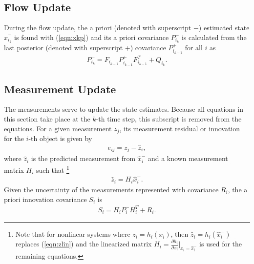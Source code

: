 \documentclass[letterpaper, paper,10pt]{AAS}		%
\newcommand{\refeqn}[1]{(\ref{eqn:#1})}
\newcommand{\deriv}[2]{\ensuremath{\frac{\partial #1}{\partial #2}}}
\begin{document}
\subsection{Flow Update}

During the flow update, the a priori (denoted with superscript $-$) estimated state $\hat x_{i_k}^-$ is found with \refeqn{xkp} and its a priori covariance $P_{i_k}^-$ is calculated from the last posterior (denoted with superscript $+$) covariance $P_{i_{k-1}}^+$ for all $i$ as
\begin{gather}
P_{i_{k}}^- = F_{i_{k-1}} P_{i_{k-1}}^+ F_{i_{k-1}}^T + Q_{i_{k}}.
\end{gather}

\subsection{Measurement Update}

The measurements serve to update the state estimates. Because all equations in this section take place at the $k$-th time step, this subscript is removed from the equations. For a given measurement $z_j$, its measurement residual or innovation for the $i$-th object is given by
\begin{align}
e_{ij} = z_j - \hat z_i,\label{eqn:eij}
\end{align}
where $\hat z_i$ is the predicted measurement from $\hat x_{i}^-$ and a known measurement matrix $H_i$ such that
\footnote{Note that for nonlinear systems where $z_i = h_i(x_i)$, then $\hat z_i = h_i(\hat x_{i}^-)$ replaces \refeqn{zlin} and the linearized matrix $H_i=\deriv{h_i}{x_i}\bigg|_{x_i=\hat x_{i}^-}$ is used for the remaining equations.\label{fn:nonlinsys}}
\begin{align}
\label{eqn:zlin}
\hat z_i = H_i\hat x_{i}^-.
\end{align}
Given the uncertainty of the measurements represented with covariance $R_i$, the a priori innovation covariance $S_{i}$ is
\begin{align}
S_{i}=H_{i}P_{i}^{-}H_{i}^T+R_{i}.\label{eqn:S}
\end{align}
\end{document}
